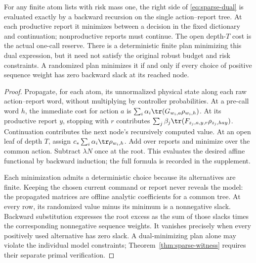 \begin{proposition}\label{prop:dual-bellman}
For any finite atom lists with risk mass one, the right side of \eqref{eq:sparse-dual} is evaluated exactly by a backward recursion on the single action--report tree. At each productive report it minimizes between a decision in the fixed dictionary and continuation; nonproductive reports must continue. The open depth-$T$ cost is the actual one-call reserve. There is a deterministic finite plan minimizing this dual expression, but it need not satisfy the original robust budget and risk constraints. A randomized plan minimizes it if and only if every choice of positive sequence weight has zero backward slack at its reached node.
\end{proposition}
\begin{proof}
Propagate, for each atom, its unnormalized physical state along each raw action--report word, without multiplying by controller probabilities. At a pre-call word $h$, the immediate cost for action $a$ is $\sum_i\alpha_i\tr(G_{w_i,a}\rho_{w_i,h})$. At its productive report $y$, stopping with $r$ contributes $\sum_j\beta_j\tr(F_{z_j,a,y,r}\rho_{z_j,hay})$. Continuation contributes the next node's recursively computed value. At an open leaf of depth $T$, assign $c_*\sum_i\alpha_i\tr\rho_{w_i,h}$. Add over reports and minimize over the common action. Subtract $\lambda N$ once at the root. This evaluates the desired affine functional by backward induction; the full formula is recorded in the supplement.

Each minimization admits a deterministic choice because its alternatives are finite. Keeping the chosen current command or report never reveals the model: the propagated matrices are offline analytic coefficients for a common tree. At every row, its randomized value minus its minimum is a nonnegative slack. Backward substitution expresses the root excess as the sum of those slacks times the corresponding nonnegative sequence weights. It vanishes precisely when every positively used alternative has zero slack. A dual-minimizing plan alone may violate the individual model constraints; Theorem~\ref{thm:sparse-witness} requires their separate primal verification.
\end{proof}

